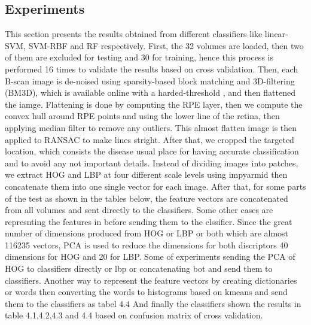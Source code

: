 \subsection{Experiments}
This section presents the results obtained from different classifiers like linear-SVM, SVM-RBF and RF respectively.
First, the 32 volumes are loaded, then two of them are excluded for testing and 30 for training, hence this process is performed 16 times to validate the results based on cross validation.
Then, each B-scan image is de-noised using sparsity-based block matching and 3D-filtering (BM3D), which is available online with a harded-threshold , and then flattened the iamge.
Flattening is done by computing the RPE layer, then we compute the convex hull around RPE points and using the lower line of the retina, then applying median filter to remove any outliers.
This almost flatten image is then applied to RANSAC to make lines stright.
After that, we cropped the targeted location, which consists the disease usual place for having accurate classification and to avoid any not important details.
Instead of dividing images into patches, we extract HOG and LBP at four different scale levels using impyarmid then concatenate them into one single vector for each image.
After that, for some parts of the test as shown in the tables below, the feature vectors are concatenated from all volumes and sent directly to the classifiers.
Some other cases are represnting the features in before sending them to the clssifier.
Since the great number of dimensions produced from HOG or LBP or both which are almost 116235 vectors, PCA is used to reduce the dimensions for both discriptors 40 dimensions for HOG and 20 for LBP.
Some of experiments sending the PCA of HOG to classifiers directly or lbp or concatenating bot and send them to classifiers.
Another way to represent the feature vectors by creating dictionaries or words then converting the words to histograms based on kmeans and send them to the classifiers as tabel 4.4
And finally the classifiers shown the results in table 4.1,4.2,4.3 and 4.4 based on confusion matrix of cross validation.
